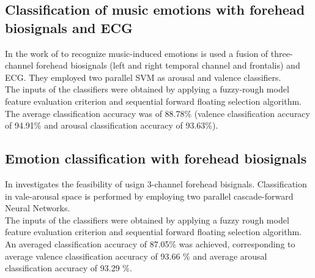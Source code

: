 \subsection{Classification of music emotions with  forehead biosignals and ECG}
In the work of \cite{naji2014classification} to recognize music-induced emotions is used a fusion of three-channel forehead biosignals (left and right temporal channel and frontalis) and ECG. They employed two parallel SVM as arousal and valence classifiers.
\\ \indent
The inputs of the classifiers were obtained by applying a fuzzy-rough model feature evaluation criterion and sequential forward floating selection algorithm.
\\
The average classification accuracy was of 88.78\% (valence classification accuracy of 94.91\% and arousal classification accuracy of 93.63\%).

\subsection{Emotion classification with forehead biosignals}
In \cite{naji2015emotion} investigates the feasibility of usign 3-channel forehead bisignals. Classification in vale-arousal space is performed by employing two parallel cascade-forward Neural Networks.
\\
The inputs of the classifiers were obtained by applying a fuzzy rough model feature evaluation criterion and sequential forward floating selection algorithm. An averaged classification accuracy of 87.05\% was achieved, corresponding to average valence classification accuracy of 93.66 \% and average arousal classification accuracy of 93.29 \%.







